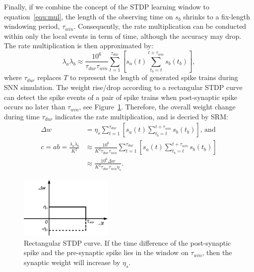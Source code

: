 Finally, if we combine the concept of the STDP learning window to equation~\ref{equ:mul}, the length of the observing time on $s_b$ shrinks to a fix-length windowing period, $\tau_{win}$.
Consequently, the rate multiplication can be conducted within only the local events in term of time, although the accuracy may drop.
The rate multiplication is then approximated by:
\begin{equation}
\lambda_a \lambda_b \approx \frac{10^6}{\tau_{dur} \tau_{win}} \sum_{t=1}^{\tau_{dur}} [s_a(t) \sum_{t_b=t}^{t+\tau_{win}} s_b(t_b)],
\end{equation} 
where $\tau_{dur}$ replaces $T$ to represent the length of generated spike trains during SNN simulation.
The weight rise/drop according to a rectangular STDP curve can detect the spike events of a pair of spike trains when post-synaptic spike occurs no later than $\tau_{win}$, see Figure~\ref{fig:rtg_stdp}.
Therefore, the overall weight change during time $\tau_{dur}$ indicates the rate multiplication, and is decried by SRM:
\begin{equation}
\begin{aligned}
\Delta w &= \eta_s \sum_{t=1}^{\tau_{dur}} [s_a(t) \sum_{t_b=t}^{t+\tau_{win}} s_b(t_b)] \text{, and}\\
c=ab=\frac{\lambda_a \lambda_b}{K^2} &\approx \frac{10^6}{K^2 \tau_{dur} \tau_{win}} \sum_{t=1}^{\tau_{dur}} [s_a(t) \sum_{t_b=t}^{t+\tau_{win}} s_b(t_b)] \\
&\approx  \frac{10^6 \Delta w}{K^2 \tau_{dur} \tau_{win}  \eta_s}.
\end{aligned}
\label{equ:srm}
\end{equation} 
\begin{figure}
	\centering
	\includegraphics[width=0.4\textwidth]{pics_sdlm/stdp.pdf}
	\caption{Rectangular STDP curve.
		If the time difference of the post-synaptic spike and the pre-synaptic spike lies in the window on $\tau_{win}$, then the synaptic weight will increase by $\eta_s$.}
	\label{fig:rtg_stdp}
\end{figure}

